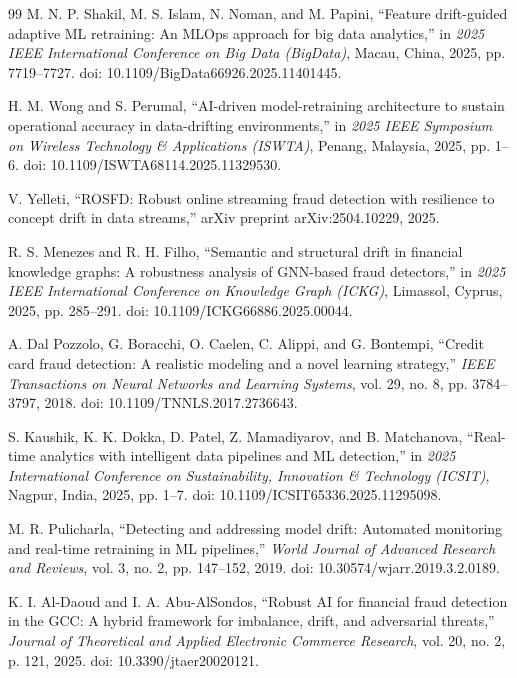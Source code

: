 \begin{thebibliography}{99}
M. N. P. Shakil, M. S. Islam, N. Noman, and M. Papini, ``Feature drift-guided adaptive ML retraining: An MLOps approach for big data analytics,'' in \textit{2025 IEEE International Conference on Big Data (BigData)}, Macau, China, 2025, pp. 7719--7727. doi: 10.1109/BigData66926.2025.11401445.

H. M. Wong and S. Perumal, ``AI-driven model-retraining architecture to sustain operational accuracy in data-drifting environments,'' in \textit{2025 IEEE Symposium on Wireless Technology \& Applications (ISWTA)}, Penang, Malaysia, 2025, pp. 1--6. doi: 10.1109/ISWTA68114.2025.11329530.

V. Yelleti, ``ROSFD: Robust online streaming fraud detection with resilience to concept drift in data streams,'' arXiv preprint arXiv:2504.10229, 2025.

R. S. Menezes and R. H. Filho, ``Semantic and structural drift in financial knowledge graphs: A robustness analysis of GNN-based fraud detectors,'' in \textit{2025 IEEE International Conference on Knowledge Graph (ICKG)}, Limassol, Cyprus, 2025, pp. 285--291. doi: 10.1109/ICKG66886.2025.00044.

A. Dal Pozzolo, G. Boracchi, O. Caelen, C. Alippi, and G. Bontempi, ``Credit card fraud detection: A realistic modeling and a novel learning strategy,'' \textit{IEEE Transactions on Neural Networks and Learning Systems}, vol. 29, no. 8, pp. 3784--3797, 2018. doi: 10.1109/TNNLS.2017.2736643.

S. Kaushik, K. K. Dokka, D. Patel, Z. Mamadiyarov, and B. Matchanova, ``Real-time analytics with intelligent data pipelines and ML detection,'' in \textit{2025 International Conference on Sustainability, Innovation \& Technology (ICSIT)}, Nagpur, India, 2025, pp. 1--7. doi: 10.1109/ICSIT65336.2025.11295098.

M. R. Pulicharla, ``Detecting and addressing model drift: Automated monitoring and real-time retraining in ML pipelines,'' \textit{World Journal of Advanced Research and Reviews}, vol. 3, no. 2, pp. 147--152, 2019. doi: 10.30574/wjarr.2019.3.2.0189.

K. I. Al-Daoud and I. A. Abu-AlSondos, ``Robust AI for financial fraud detection in the GCC: A hybrid framework for imbalance, drift, and adversarial threats,'' \textit{Journal of Theoretical and Applied Electronic Commerce Research}, vol. 20, no. 2, p. 121, 2025. doi: 10.3390/jtaer20020121.


\end{thebibliography}
